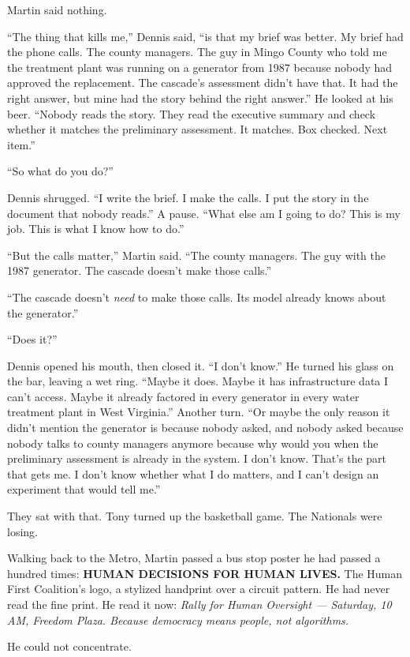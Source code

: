 Martin said nothing.

``The thing that kills me,'' Dennis said, ``is that my brief was better. My brief had the phone calls. The county managers. The guy in Mingo County who told me the treatment plant was running on a generator from 1987 because nobody had approved the replacement. The cascade's assessment didn't have that. It had the right answer, but mine had the story behind the right answer.'' He looked at his beer. ``Nobody reads the story. They read the executive summary and check whether it matches the preliminary assessment. It matches. Box checked. Next item.''

``So what do you do?''

Dennis shrugged. ``I write the brief. I make the calls. I put the story in the document that nobody reads.'' A pause. ``What else am I going to do? This is my job. This is what I know how to do.''

``But the calls matter,'' Martin said. ``The county managers. The guy with the 1987 generator. The cascade doesn't make those calls.''

``The cascade doesn't \emph{need} to make those calls. Its model already knows about the generator.''

``Does it?''

Dennis opened his mouth, then closed it. ``I don't know.'' He turned his glass on the bar, leaving a wet ring. ``Maybe it does. Maybe it has infrastructure data I can't access. Maybe it already factored in every generator in every water treatment plant in West Virginia.'' Another turn. ``Or maybe the only reason it didn't mention the generator is because nobody asked, and nobody asked because nobody talks to county managers anymore because why would you when the preliminary assessment is already in the system. I don't know. That's the part that gets me. I don't know whether what I do matters, and I can't design an experiment that would tell me.''

They sat with that. Tony turned up the basketball game. The Nationals were losing.

Walking back to the Metro, Martin passed a bus stop poster he had passed a hundred times: \textbf{HUMAN DECISIONS FOR HUMAN LIVES.} The Human First Coalition's logo, a stylized handprint over a circuit pattern. He had never read the fine print. He read it now: \emph{Rally for Human Oversight --- Saturday, 10 AM, Freedom Plaza. Because democracy means people, not algorithms.}


He could not concentrate.

